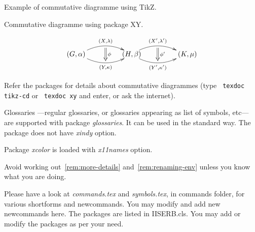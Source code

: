 Example of commutative diagramme using TikZ.
    \begin{center}
    \end{center}

    Commutative diagramme using package XY.
    
    \begin{figure}[htb]
      \[
        \xymatrix@1@C=3em{ (G,\alpha)\quad
      \ar@/^1pc/[r]^{(X,\lambda)}_{}="0"
      \ar@/_1pc/[r]_{(Y,\kappa)}^{}="1" \ar@{=>}"0";"1"^{\phi} &
      \quad(H,\beta)\quad \ar@/^1pc/[r]^{(X',\lambda')}_{}="0"
      \ar@/_1pc/[r]_{(Y',\kappa')}^{}="1" \ar@{=>}"0";"1"^{\phi'}&
      \quad(K,\mu) }
  \]
    \caption{}
    \label{fig:vert-comp}
  \end{figure}


  Refer the packages for details about commutative diagrammes (type
  \verb+ texdoc tikz-cd+ or
  \verb+ texdoc xy+ and enter, or ask the internet).


 Glossaries ---regular glossaries, or glossaries appearing as list of
 symbols, etc--- are supported with package \emph{glossaries}. It can
 be used in the standard way. The package does not have \emph{xindy} option.

 Package \emph{xcolor} is loaded with \emph{x11names} option.

 Avoid working out~\ref{rem:more-details} and~\ref{rem:renaming-env}
 unless you know what you are doing.
 \begin{remark}
   \label{rem:more-details}
   Please have a look at \emph{commands.tex} and \emph{symbols.tex},
   in commands folder, for various shortforms and newcommands. You may
   modify and add new newcommands here. The packages are listed in
   IISERB.cls. You may add or modify the packages as per your need.
 \end{remark}
  
